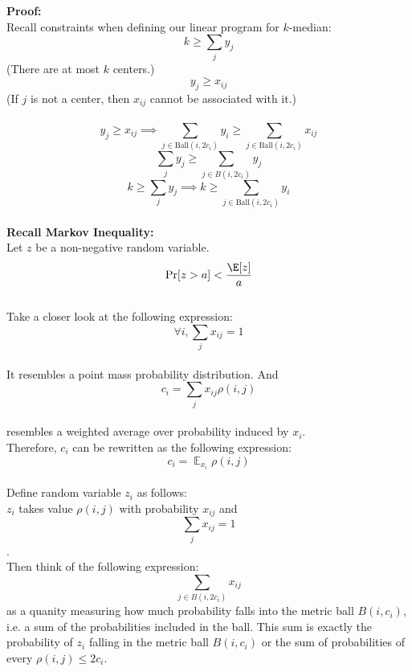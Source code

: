 \noindent\textbf{Proof:} \\

\noindent Recall constraints when defining our linear program for $k$-median: \\
$$ k \geq \sum\limits_{j} y_j$$ (There are at most $k$ centers.)\\
$$ y_{j} \geq x_{ij}$$ (If $j$ is not a center, then $x_{ij}$ cannot be associated with it.) \\ \\

\noindent $$ y_{j} \geq x_{ij} \implies \sum_{j \in \text{Ball}(i, 2c_i)}y_i \geq \sum_{j \in \text{Ball}(i, 2c_i)}x_{ij} $$
$$ \sum\limits_{j}y_j \geq \sum\limits_{j \in B(i, 2c_i)}y_j $$ 
$$ k \geq \sum\limits_{j} y_j \implies k \geq \sum_{j \in \text{Ball}(i, 2c_i)}y_i $$ \\
\noindent\textbf{Recall Markov Inequality:} \\

\noindent Let $z$ be a non-negative random variable. \\
$$ \Pr[z > a] < \frac{\E[z]}{a} $$ \\ 

\noindent Take a closer look at the following expression: \\
$$ \forall i, \sum\limits_{j}x_{ij} = 1 $$ \\
\noindent It resembles a point mass probability distribution. And \\

\noindent $$ c_i = \sum\limits_{j}x_{ij}\rho(i,j) $$ \\
\noindent resembles a weighted average over probability induced by $x_i$.  \\ Therefore, $c_i$ can be rewritten as the following expression: \\

\noindent $$ c_i = \displaystyle \mathop{\mathbb{E}}_{x_i}\rho(i,j) $$ \\
Define random variable $z_i$ as follows: \\
$z_i$ takes value $\rho(i,j)$ with probability $x_{ij}$ and $$ \sum\limits_{j}x_{ij} = 1 $$.\\

\noindent Then think of the following expression: 
$$ \sum\limits_{j \in B(i, 2c_i)}x_{ij} $$ 
as a quanity measuring how much probability falls into the metric ball $B(i, c_i)$, i.e. a sum of the probabilities included in the ball. This sum is exactly the probability of $z_i$ falling in the metric ball $B(i,c_i)$ or the sum of probabilities of every $\rho(i,j) \leq 2c_i$. \\

